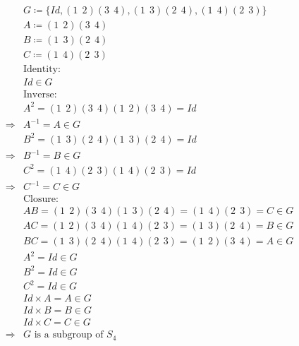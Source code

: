 \documentclass{article}
\begin{document}
\begin{equation*}
    \begin{split}
        &G\coloneqq\{Id,(1\ \ 2)(3\ \ 4),(1\ \ 3)(2\ \ 4),(1\ \ 4)(2\ \ 3)\}\\
        &A\coloneqq(1\ \ 2)(3\ \ 4)\\
        &B\coloneqq(1\ \ 3)(2\ \ 4)\\
        &C\coloneqq(1\ \ 4)(2\ \ 3)\\
        &\text{Identity}:\\
        &Id\in G\\
        &\text{Inverse}:\\
        &A^2=(1\ \ 2)(3\ \ 4)(1\ \ 2)(3\ \ 4)=Id\\
        \Rightarrow&A^{-1}=A\in G\\
        &B^2=(1\ \ 3)(2\ \ 4)(1\ \ 3)(2\ \ 4)=Id\\
        \Rightarrow&B^{-1}=B\in G\\
        &C^2=(1\ \ 4)(2\ \ 3)(1\ \ 4)(2\ \ 3)=Id\\
        \Rightarrow&C^{-1}=C\in G\\
        &\text{Closure}:\\
        &AB=(1\ \ 2)(3\ \ 4)(1\ \ 3)(2\ \ 4)=(1\ \ 4)(2\ \ 3)=C\in G\\
        &AC=(1\ \ 2)(3\ \ 4)(1\ \ 4)(2\ \ 3)=(1\ \ 3)(2\ \ 4)=B\in G\\
        &BC=(1\ \ 3)(2\ \ 4)(1\ \ 4)(2\ \ 3)=(1\ \ 2)(3\ \ 4)=A\in G\\
        &A^2=Id\in G\\
        &B^2=Id\in G\\
        &C^2=Id\in G\\
        &Id\times A=A\in G \\
        &Id\times B=B\in G \\
        &Id\times C=C\in G \\
        \Rightarrow&G\text{ is a subgroup of }S_4\\
    \end{split}
\end{equation*}
\end{document}
